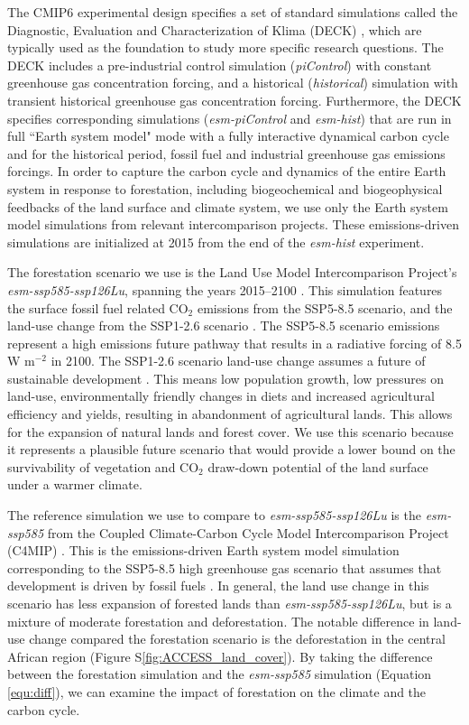 \documentclass[]{article}
\begin{document}
The CMIP6 experimental design specifies a set of standard simulations called the Diagnostic, Evaluation and Characterization of Klima (DECK) \parencite{eyring_overview_2016}, which are typically used as the foundation to study more specific research questions.
The DECK includes a pre-industrial control simulation (\textit{piControl}) with constant greenhouse gas concentration forcing, and a historical (\textit{historical}) simulation with transient historical greenhouse gas concentration forcing.
Furthermore, the DECK specifies corresponding simulations (\textit{esm-piControl} and \textit{esm-hist}) that are run in full ``Earth system model" mode with a fully interactive dynamical carbon cycle and for the historical period, fossil fuel and industrial greenhouse gas emissions forcings.
In order to capture the carbon cycle and dynamics of the entire Earth system in response to forestation, including biogeochemical and biogeophysical feedbacks of the land surface and climate system, we use only the Earth system model simulations from relevant intercomparison projects. These emissions-driven simulations are initialized at 2015 from the end of the \textit{esm-hist} experiment.

The forestation scenario we use is the Land Use Model Intercomparison Project's \textit{esm-ssp585-ssp126Lu}, spanning the years 2015--2100 \parencite{lawrence_land_2016}.
This simulation features the surface fossil fuel related CO$_{2}$ emissions from the SSP5-8.5 scenario, and the land-use change from the SSP1-2.6 scenario \parencite{oneill_scenario_2016}.
The SSP5-8.5 scenario emissions represent a high emissions future pathway that results in a radiative forcing of 8.5 W m$^{-2}$ in 2100.
The SSP1-2.6 scenario land-use change assumes a future of sustainable development \parencite{van_vuuren_energy_2017}.
This means low population growth, low pressures on land-use, environmentally friendly changes in diets and increased agricultural efficiency and yields, resulting in abandonment of agricultural lands.
This allows for the expansion of natural lands and forest cover.
We use this scenario because it represents a plausible future scenario that would provide a lower bound on the survivability of vegetation and CO$_2$ draw-down potential of the land surface under a warmer climate.

The reference simulation we use to compare to \textit{esm-ssp585-ssp126Lu} is the \textit{esm-ssp585} from the Coupled Climate-Carbon Cycle Model Intercomparison Project (C4MIP) \parencite{jones_c4mip_2016}.
This is the emissions-driven Earth system model simulation corresponding to the SSP5-8.5 high greenhouse gas scenario that assumes that development is driven by fossil fuels \parencite{oneill_scenario_2016}.
In general, the land use change in this scenario has less expansion of forested lands than \textit{esm-ssp585-ssp126Lu}, but is a mixture of moderate forestation and deforestation.
The notable difference in land-use change compared the forestation scenario is the deforestation in the central African region (Figure S\ref{fig:ACCESS_land_cover}).
By taking the difference between the forestation simulation and the \textit{esm-ssp585} simulation (Equation \ref{equ:diff}), we can examine the impact of forestation on the climate and the carbon cycle.
\end{document}
